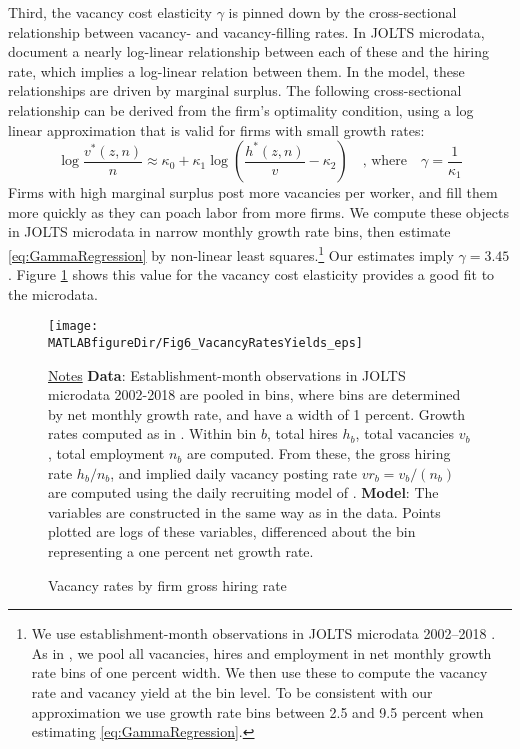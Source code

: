 Third, the vacancy cost elasticity $\gamma$ is pinned down by the cross-sectional relationship between vacancy- and vacancy-filling rates.
In JOLTS microdata, \citet{DFH} document a nearly log-linear relationship between each of these and the hiring rate, which implies a log-linear relation between them.
In the model, these relationships are driven by marginal surplus.
The following cross-sectional relationship can be derived from the firm's optimality condition, using a log linear approximation that is valid for firms with small growth rates:
\begin{equation}
\label{eq:GammaRegression}
\log \frac{v^*(z,n)}{n} \approx \kappa_0 + \kappa_1 \log  \left( \frac{h^*(z,n)}{v} - \kappa_2 \right)\quad\text{, where}\quad \gamma = \frac{1}{\kappa_1}
\end{equation}
Firms with high marginal surplus post more vacancies per worker, and fill them more quickly as they can poach labor from more firms.
We compute these objects in JOLTS microdata in narrow monthly growth rate bins, then estimate \eqref{eq:GammaRegression} by non-linear least squares.\footnote{
    We use establishment-month observations in JOLTS microdata 2002--2018  \citep[see][]{MongeyViolante}.
    As in \citet{DFH}, we pool all vacancies, hires and employment in net monthly growth rate bins of one percent width.
    We then use these to compute the vacancy rate and vacancy yield at the bin level.
    To be consistent with our approximation we use growth rate bins between 2.5 and 9.5 percent when estimating \eqref{eq:GammaRegression}.}
Our estimates imply $\gamma=3.45$.
Figure \ref{figure:_VacDec} shows this value for the vacancy cost elasticity provides a good fit to the microdata.


\begin{figure}[t]
\vspace*{-0.1cm}
\begin{center}
\hspace*{-.5cm}
\texttt{[image: \\MATLABfigureDir/Fig6\_VacancyRatesYields\_eps]}
\caption{Vacancy rates by firm gross hiring rate}\label{figure:_VacDec}\vspace*{-0.3cm}
\end{center}
{\footnotesize \underline{Notes}
\textbf{Data}: Establishment-month observations in JOLTS microdata 2002-2018 are pooled in bins,
where bins are determined by net monthly growth rate, and have a width of 1 percent.
Growth rates computed as in \citet{DFH}.
Within bin $b$, total hires $h_b$, total vacancies $v_b$, total employment $n_b$ are computed.
From these, the gross hiring rate $h_b/n_b$, and implied daily vacancy posting rate $vr_b = v_b/(n_b)$ are computed using the daily recruiting model of \citet{DFH}.
\textbf{Model}: The variables are constructed in the same way as in the data.
Points plotted are logs of these variables, differenced about the bin representing a one percent net growth rate.
}
\end{figure}

